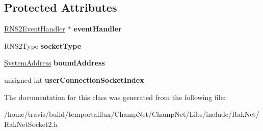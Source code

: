 \subsection*{Protected Attributes}
\begin{DoxyCompactItemize}
\item 
\hypertarget{class_rak_net_1_1_rak_net_socket2_a731fd2d47f9182b93715bbce8388413d}{\hyperlink{class_rak_net_1_1_r_n_s2_event_handler}{R\-N\-S2\-Event\-Handler} $\ast$ {\bfseries event\-Handler}}\label{class_rak_net_1_1_rak_net_socket2_a731fd2d47f9182b93715bbce8388413d}

\item 
\hypertarget{class_rak_net_1_1_rak_net_socket2_ae83b7f902e95eea06ae8cc3f858d8f1c}{R\-N\-S2\-Type {\bfseries socket\-Type}}\label{class_rak_net_1_1_rak_net_socket2_ae83b7f902e95eea06ae8cc3f858d8f1c}

\item 
\hypertarget{class_rak_net_1_1_rak_net_socket2_a1df2bffcc8b3e8dd6ed712c71fd2a416}{\hyperlink{struct_rak_net_1_1_system_address}{System\-Address} {\bfseries bound\-Address}}\label{class_rak_net_1_1_rak_net_socket2_a1df2bffcc8b3e8dd6ed712c71fd2a416}

\item 
\hypertarget{class_rak_net_1_1_rak_net_socket2_ac542010af7d0ad079fbe2d16b4daec8f}{unsigned int {\bfseries user\-Connection\-Socket\-Index}}\label{class_rak_net_1_1_rak_net_socket2_ac542010af7d0ad079fbe2d16b4daec8f}

\end{DoxyCompactItemize}


The documentation for this class was generated from the following file\-:\begin{DoxyCompactItemize}
\item 
/home/travis/build/temportalflux/\-Champ\-Net/\-Champ\-Net/\-Libs/include/\-Rak\-Net/Rak\-Net\-Socket2.\-h\end{DoxyCompactItemize}
